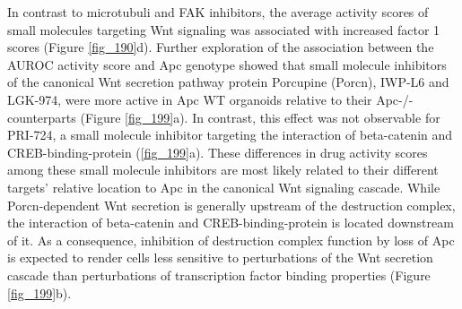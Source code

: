 \begin{flushleft}
In contrast to microtubuli and FAK inhibitors, the average activity scores of small molecules targeting Wnt signaling was associated with increased factor 1 scores (Figure \ref{fig_190}d). Further exploration of the association between the AUROC activity score and Apc genotype showed that small molecule inhibitors of the canonical Wnt secretion pathway protein Porcupine (Porcn), IWP-L6 and LGK-974, were more active in Apc WT organoids relative to their Apc-/- counterparts (Figure \ref{fig_199}a). In contrast, this effect was not observable for PRI-724, a small molecule inhibitor targeting the interaction of beta-catenin and CREB-binding-protein (\ref{fig_199}a). These differences in drug activity scores among these small molecule inhibitors are most likely related to their different targets' relative location to Apc in the canonical Wnt signaling cascade. While Porcn-dependent Wnt secretion is generally upstream of the destruction complex, the interaction of beta-catenin and CREB-binding-protein is located downstream of it. As a consequence, inhibition of destruction complex function by loss of Apc is expected to render cells less sensitive to perturbations of the Wnt secretion cascade than perturbations of transcription factor binding properties (Figure \ref{fig_199}b). 


\end{flushleft}
